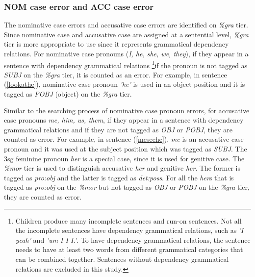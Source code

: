 \subsubsection{NOM case error and ACC case error}
The nominative case errors and accusative case errors are identified on \textit{\%gra} tier. Since nominative case and accusative case are assigned at a sentential level, \textit{\%gra} tier is more appropriate to use since it represents grammatical dependency relations. For nominative case pronouns (\textit{I, he, she, we, they}), if they appear in a sentence with dependency grammatical relations \footnote{Children produce many incomplete sentences and run-on sentences. Not all the incomplete sentences have dependency grammatical relations, such as \textit{'I yeah'} and \textit{'um I I I.'}. To have dependency grammatical relations, the sentence needs to have at least two words from different grammatical categories that can be combined together. Sentences without dependency grammatical relations are excluded in this study.}if the pronoun is not tagged as \textit{SUBJ} on the \textit{\%gra} tier, it is counted as an error. For example, in sentence (\ref{lookathe}), nominative case pronoun \textit{'he'} is used in an object position and it is tagged as \textit{POBJ} (object) on the \textit{\%gra} tier. 



Similar to the searching process of nominative case pronoun errors, for accusative case pronouns \textit{me, him, us, them}, if they appear in a sentence with dependency grammatical relations and if they are not tagged as \textit{OBJ} or \textit{POBJ}, they are counted as error. For example, in sentence (\ref{meseehe}), \textit{me} is an accusative case pronoun and it was used at the subject position which was tagged as \textit{SUBJ}. The 3sg feminine pronoun \textit{her} is a special case, since it is used for genitive case. The \textit{\%mor} tier is used to distinguish accusative \textit{her} and genitive \textit{her}. The former is tagged as \textit{pro:obj} and the latter is tagged as \textit{det:poss}. For all the \textit{her}s that is tagged as \textit{pro:obj} on the \textit{\%mor} but not tagged as \textit{OBJ} or \textit{POBJ} on the \textit{\%gra} tier, they are counted as error. 
